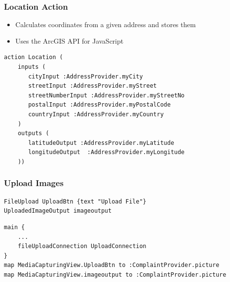 \begin{frame}[fragile]
\frametitle{Location Action}

\begin{itemize}
\item Calculates coordinates from a given address and stores them
\item Uses the ArcGIS API for JavaScript
\end{itemize}

\begin{lstlisting}[basicstyle=\footnotesize\ttfamily]
action Location (
    inputs (
       cityInput :AddressProvider.myCity
       streetInput :AddressProvider.myStreet
       streetNumberInput :AddressProvider.myStreetNo
       postalInput :AddressProvider.myPostalCode
       countryInput :AddressProvider.myCountry
    )
    outputs (
       latitudeOutput :AddressProvider.myLatitude
       longitudeOutput  :AddressProvider.myLongitude
    ))		 				
\end{lstlisting}

\end{frame}


\begin{frame}[fragile]
\frametitle{Upload Images}
\begin{lstlisting}[basicstyle=\footnotesize\ttfamily]
FileUpload UploadBtn {text "Upload File"}
UploadedImageOutput imageoutput
\end{lstlisting}

\vfill

\begin{lstlisting}[basicstyle=\footnotesize\ttfamily]
main {
	...  
	fileUploadConnection UploadConnection
}
map MediaCapturingView.UploadBtn to :ComplaintProvider.picture
map MediaCapturingView.imageoutput to :ComplaintProvider.picture
\end{lstlisting}
\end{frame}



